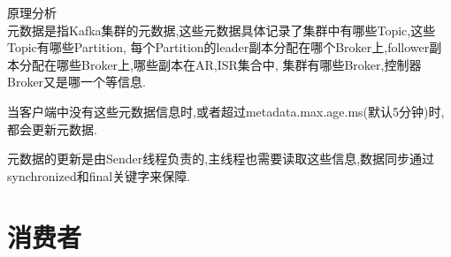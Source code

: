 \begin{frame}[plain,t]{原理分析} %
	 \\  \vspace{2ex}
	元数据是指Kafka集群的元数据,这些元数据具体记录了集群中有哪些Topic,这些Topic有哪些Partition,
	每个Partition的leader副本分配在哪个Broker上,follower副本分配在哪些Broker上,哪些副本在AR,ISR集合中,
	集群有哪些Broker,控制器Broker又是哪一个等信息.
	 \vspace{2ex}
	 
	 当客户端中没有这些元数据信息时,或者超过metadata.max.age.ms(默认5分钟)时,都会更新元数据.
	 \vspace{2ex}
	 
	 元数据的更新是由Sender线程负责的,主线程也需要读取这些信息,数据同步通过synchronized和final关键字来保障.
\end{frame}



\section{消费者}

